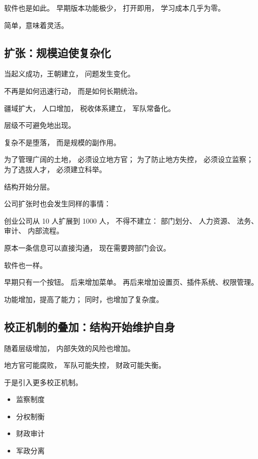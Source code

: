 \documentclass[openany, a4paper, 12pt]{book}
\begin{document}
软件也是如此。
早期版本功能极少，
打开即用，
学习成本几乎为零。

简单，意味着灵活。

\subsection{扩张：规模迫使复杂化}

当起义成功，王朝建立，
问题发生变化。

不再是如何迅速行动，
而是如何长期统治。

疆域扩大，
人口增加，
税收体系建立，
军队常备化。

层级不可避免地出现。

\begin{readingnote}
	复杂不是堕落，
	而是规模的副作用。
\end{readingnote}

为了管理广阔的土地，
必须设立地方官；
为了防止地方失控，
必须设立监察；
为了选拔人才，
必须建立科举。

结构开始分层。

公司扩张时也会发生同样的事情：

\begin{examplebox}
	创业公司从 10 人扩展到 1000 人，
	不得不建立：
	部门划分、
	人力资源、
	法务、
	审计、
	内部流程。
	
	原本一条信息可以直接沟通，
	现在需要跨部门会议。
\end{examplebox}

软件也一样。

早期只有一个按钮。
后来增加菜单。
再后来增加设置页、插件系统、权限管理。

功能增加，提高了能力；
同时，也增加了复杂度。

\subsection{校正机制的叠加：结构开始维护自身}

随着层级增加，
内部失效的风险也增加。

地方官可能腐败，
军队可能失控，
财政可能失衡。

于是引入更多校正机制。

\begin{itemize}
	\item 监察制度
	\item 分权制衡
	\item 财政审计
	\item 军政分离
\end{itemize}
\end{document}

